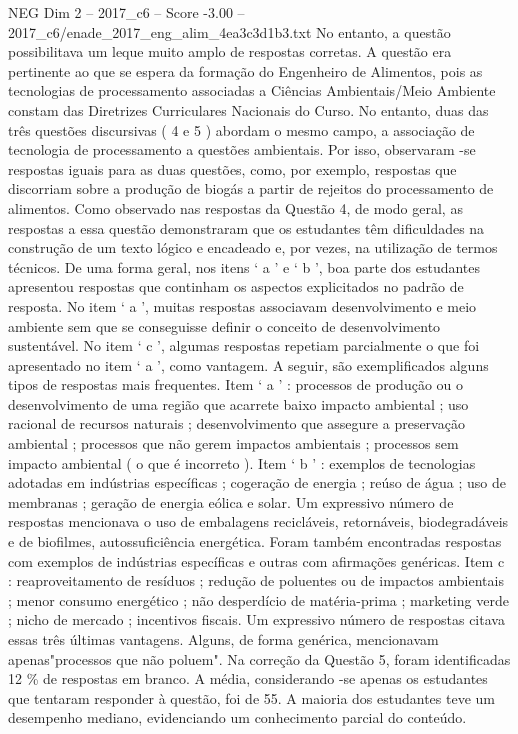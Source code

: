 \begin{textsample}{NEG Dim 2 – 2017\_c6 – Score -3.00 – 2017\_c6/enade\_2017\_eng\_alim\_4ea3c3d1b3.txt}
No entanto, a questão possibilitava um leque muito amplo de respostas corretas.
A questão era pertinente ao que se espera da formação do Engenheiro de Alimentos, pois as tecnologias de processamento associadas a Ciências Ambientais/Meio Ambiente constam das Diretrizes Curriculares Nacionais do Curso.
No entanto, duas das três questões discursivas ( 4 e 5 ) abordam o mesmo campo, a associação de tecnologia de processamento a questões ambientais.
Por isso, observaram -se respostas iguais para as duas questões, como, por exemplo, respostas que discorriam sobre a produção de biogás a partir de rejeitos do processamento de alimentos.
Como observado nas respostas da Questão 4, de modo geral, as respostas a essa questão demonstraram que os estudantes têm dificuldades na construção de um texto lógico e encadeado e, por vezes, na utilização de termos técnicos.
De uma forma geral, nos itens ‘ a ’ e ‘ b ’, boa parte dos estudantes apresentou respostas que continham os aspectos explicitados no padrão de resposta.
No item ‘ a ’, muitas respostas associavam desenvolvimento e meio ambiente sem que se conseguisse definir o conceito de desenvolvimento sustentável.
No item ‘ c ’, algumas respostas repetiam parcialmente o que foi apresentado no item ‘ a ’, como vantagem.
A seguir, são exemplificados alguns tipos de respostas mais frequentes.
Item ‘ a ’ : processos de produção ou o desenvolvimento de uma região que acarrete baixo impacto ambiental ; uso racional de recursos naturais ; desenvolvimento que assegure a preservação ambiental ; processos que não gerem impactos ambientais ; processos sem impacto ambiental ( o que é incorreto ).
Item ‘ b ’ : exemplos de tecnologias adotadas em indústrias específicas ; cogeração de energia ; reúso de água ; uso de membranas ; geração de energia eólica e solar.
Um expressivo número de respostas mencionava o uso de embalagens recicláveis, retornáveis, biodegradáveis e de biofilmes, autossuficiência energética.
Foram também encontradas respostas com exemplos de indústrias específicas e outras com afirmações genéricas.
Item c : reaproveitamento de resíduos ; redução de poluentes ou de impactos ambientais ; menor consumo energético ; não desperdício de matéria-prima ; marketing verde ; nicho de mercado ; incentivos fiscais.
Um expressivo número de respostas citava essas três últimas vantagens.
Alguns, de forma genérica, mencionavam apenas"processos que não poluem".
Na correção da Questão 5, foram identificadas 12 \% de respostas em branco.
A média, considerando -se apenas os estudantes que tentaram responder à questão, foi de 55.
A maioria dos estudantes teve um desempenho mediano, evidenciando um conhecimento parcial do conteúdo.

\end{textsample}
